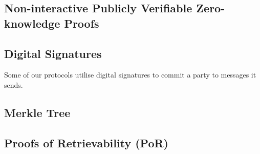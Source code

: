 



\subsection{Non-interactive Publicly Verifiable Zero-knowledge Proofs}

\subsection{Digital Signatures}

Some of our protocols utilise digital signatures to commit a party to messages it sends. 

\subsection{Merkle Tree}

\subsection{Proofs of Retrievability (PoR)}\label{PoR-def}





 

%

